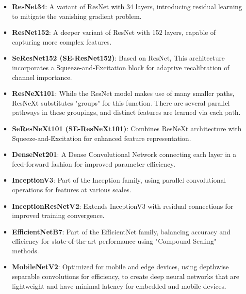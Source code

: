 \begin{itemize}
    \item \textbf{ResNet34}: A variant of ResNet with 34 layers,
          introducing residual learning to mitigate the vanishing gradient
          problem.

    \item \textbf{ResNet152}: A deeper variant of ResNet with 152
          layers, capable of capturing more complex features.

    \item \textbf{SeResNet152 (SE-ResNet152)}: Based on ResNet, This
          architecture incorporates a Squeeze-and-Excitation block for adaptive
          recalibration of channel importance.

    \item \textbf{ResNeXt101}: While the ResNet model makes use of many
          smaller paths, ResNeXt substitutes "groups" for this function. There
          are
          several parallel pathways in these groupings, and distinct features
          are learned
          via each path.

    \item \textbf{SeResNeXt101 (SE-ResNeXt101)}: Combines ResNeXt
          architecture with Squeeze-and-Excitation for enhanced feature
          representation.

    \item \textbf{DenseNet201}: A Dense Convolutional Network
          connecting each layer in a feed-forward fashion for improved
          parameter
          efficiency.

    \item \textbf{InceptionV3}: Part of the Inception family, using
          parallel convolutional operations for features at various scales.

    \item \textbf{InceptionResNetV2}: Extends InceptionV3 with residual
          connections for improved training convergence.

    \item \textbf{EfficientNetB7}: Part of the EfficientNet family,
          balancing accuracy and efficiency for state-of-the-art performance
          using
          "Compound Scaling" methods.

    \item \textbf{MobileNetV2}: Optimized for mobile and edge devices,
          using depthwise separable convolutions for efficiency, to create deep
          neural
          networks that are lightweight and have minimal latency for embedded
          and mobile
          devices.

\end{itemize}

